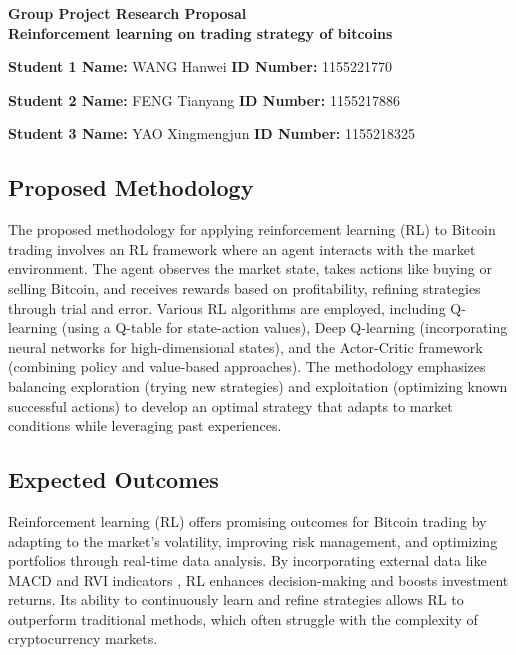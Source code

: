 \documentclass[12pt]{article}
\begin{document}
 
\begin{center}  
    \textbf{Group Project Research Proposal} \\[0.5em]  
    \large \textbf{Reinforcement learning on trading strategy of bitcoins}  
\end{center}

\begin{center}
\small

\textbf{Student 1 Name:} WANG Hanwei
\textbf{ ID Number:} 1155221770

\textbf{Student 2 Name:} FENG Tianyang
\textbf{ID Number:} 1155217886

\textbf{Student 3 Name:} YAO Xingmengjun
\textbf{ID Number:} 1155218325

\end{center}




\subsection*{Proposed Methodology}

The proposed methodology for applying reinforcement learning (RL) to Bitcoin trading\cite{dyhrberg2018investible} involves an RL framework where an agent interacts with the market environment. The agent observes the market state, takes actions like buying or selling Bitcoin, and receives rewards based on profitability, refining strategies through trial and error. Various RL algorithms are employed, including Q-learning (using a Q-table for state-action values), Deep Q-learning \cite{tan2017deep} (incorporating neural networks for high-dimensional states), and the Actor-Critic \cite{barto2020looking} framework (combining policy and value-based approaches). The methodology emphasizes balancing exploration (trying new strategies) and exploitation (optimizing known successful actions) to develop an optimal strategy that adapts to market conditions while leveraging past experiences.

\subsection*{Expected Outcomes}
Reinforcement learning (RL)\cite{szepesvari2022algorithms} offers promising outcomes for Bitcoin trading by adapting to the market's volatility, improving risk management, and optimizing portfolios through real-time data analysis. By incorporating external data like MACD and RVI indicators \cite{eric2009application}, RL enhances decision-making and boosts investment returns. Its ability to continuously learn and refine strategies allows RL to outperform traditional methods, which often struggle with the complexity of cryptocurrency markets.
\end{document}
